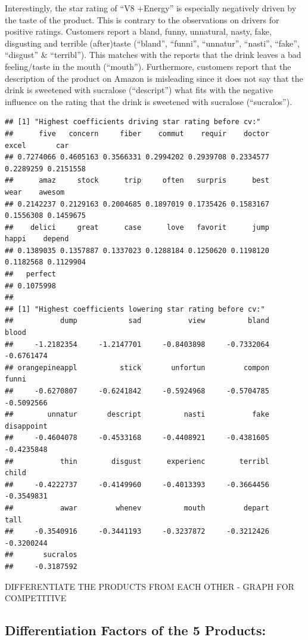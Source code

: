 \documentclass[
]{article}
\begin{document}
Interestingly, the star rating of ``V8 +Energy'' is especially
negatively driven by the taste of the product. This is contrary to the
observations on drivers for positive ratings. Customers report a bland,
funny, unnatural, nasty, fake, disgusting and terrible (after)taste
(``bland'', ``funni'', ``unnatur'', ``nasti'', ``fake'', ``disgust'' \&
``terribl''). This matches with the reports that the drink leaves a bad
feeling/taste in the mouth (``mouth''). Furthermore, customers report
that the description of the product on Amazon is misleading since it
does not say that the drink is sweetened with sucralose (``descript'')
what fits with the negative influence on the rating that the drink is
sweetened with sucralose (``sucralos''). \small

\begin{verbatim}
## [1] "Highest coefficients driving star rating before cv:"
##      five   concern     fiber    commut    requir    doctor     excel       car 
## 0.7274066 0.4605163 0.3566331 0.2994202 0.2939708 0.2334577 0.2289259 0.2151558 
##      amaz     stock      trip     often   surpris      best      wear    awesom 
## 0.2142237 0.2129163 0.2004685 0.1897019 0.1735426 0.1583167 0.1556308 0.1459675 
##    delici     great      case      love   favorit      jump     happi    depend 
## 0.1389035 0.1357887 0.1337023 0.1288184 0.1250620 0.1198120 0.1182568 0.1129904 
##   perfect 
## 0.1075998 
## 
## [1] "Highest coefficients lowering star rating before cv:"
##           dump            sad           view          bland          blood 
##     -1.2182354     -1.2147701     -0.8403898     -0.7332064     -0.6761474 
## orangepineappl          stick       unfortun         compon          funni 
##     -0.6270807     -0.6241842     -0.5924968     -0.5704785     -0.5092566 
##        unnatur       descript          nasti           fake     disappoint 
##     -0.4604078     -0.4533168     -0.4408921     -0.4381605     -0.4235848 
##           thin        disgust      experienc        terribl          child 
##     -0.4222737     -0.4149960     -0.4013393     -0.3664456     -0.3549831 
##           awar         whenev          mouth         depart           tall 
##     -0.3540916     -0.3441193     -0.3237872     -0.3212426     -0.3200244 
##       sucralos 
##     -0.3187592
\end{verbatim}

DIFFERENTIATE THE PRODUCTS FROM EACH OTHER - GRAPH FOR COMPETITIVE

\normalsize

\hypertarget{differentiation-factors-of-the-5-products}{%
\subsection{Differentiation Factors of the 5
Products:}\label{differentiation-factors-of-the-5-products}}
\end{document}
